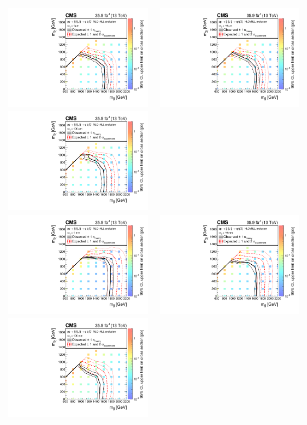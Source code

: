 \begin{figure}[!p]
  \centering
  \includegraphics[width=0.33\textwidth]{CMS-SUS-16-038_Figure_004-a.pdf}~
  \includegraphics[width=0.33\textwidth]{CMS-SUS-16-038_Figure_004-b.pdf}~
  \includegraphics[width=0.33\textwidth]{CMS-SUS-16-038_Figure_004-c.pdf}\\
  \includegraphics[width=0.33\textwidth]{CMS-SUS-16-038_Figure_004-d.pdf}~
  \includegraphics[width=0.33\textwidth]{CMS-SUS-16-038_Figure_004-e.pdf}~
  \includegraphics[width=0.33\textwidth]{CMS-SUS-16-038_Figure_004-f.pdf}\\

\end{figure}
